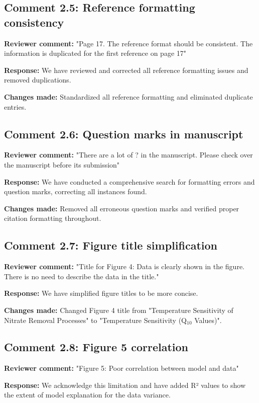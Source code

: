 \documentclass[12pt,a4paper]{article}
\begin{document}
\subsection{Comment 2.5: Reference formatting consistency}
\textbf{Reviewer comment:} "Page 17. The reference format should be consistent. The information is duplicated for the first reference on page 17"

\textbf{Response:} We have reviewed and corrected all reference formatting issues and removed duplications.

\textbf{Changes made:} Standardized all reference formatting and eliminated duplicate entries.

\subsection{Comment 2.6: Question marks in manuscript}
\textbf{Reviewer comment:} "There are a lot of ? in the manuscript. Please check over the manuscript before its submission"

\textbf{Response:} We have conducted a comprehensive search for formatting errors and question marks, correcting all instances found.

\textbf{Changes made:} Removed all erroneous question marks and verified proper citation formatting throughout.

\subsection{Comment 2.7: Figure title simplification}
\textbf{Reviewer comment:} "Title for Figure 4: Data is clearly shown in the figure. There is no need to describe the data in the title."

\textbf{Response:} We have simplified figure titles to be more concise.

\textbf{Changes made:} Changed Figure 4 title from "Temperature Sensitivity of Nitrate Removal Processes" to "Temperature Sensitivity (Q$_{10}$ Values)".

\subsection{Comment 2.8: Figure 5 correlation}
\textbf{Reviewer comment:} "Figure 5: Poor correlation between model and data"

\textbf{Response:} We acknowledge this limitation and have added R² values to show the extent of model explanation for the data variance.
\end{document}
